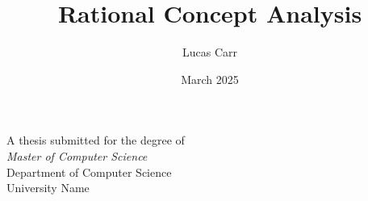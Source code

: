 \documentclass[12pt,a4paper]{report}
\title{Rational Concept Analysis}
\author{Lucas Carr}
\date{March 2025}
\begin{document}
\begin{titlepage}
  \centering
  \vspace*{4cm}
  {\Huge \bfseries \thetitle \par}
  \vspace{1.5cm}
  {\Large \theauthor \par}
  \vfill
  A thesis submitted for the degree of \\
  \textit{Master of Computer Science} \\
  Department of Computer Science \\
  University Name \\
  \vspace{1cm}
  \thedate
\end{titlepage}


% 
\tableofcontents
% 


% 
% 
% 
\printbibliography

\printindex
\end{document}
